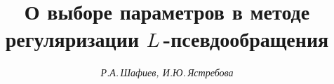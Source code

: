 

 


%


 


\newcommand{\tts}[1]{} 


 




\setcounter{page}{71} 












 


\author{\it Р.А.\,Шафиев, И.Ю.\,Ястребова } 




\title{О выборе параметров в методе\\  


регуляризации $L$\,-псевдообращения} 


 


\date{} 




\pagestyle{plain} %


 




\maketitle 


\label{begin} 


 


